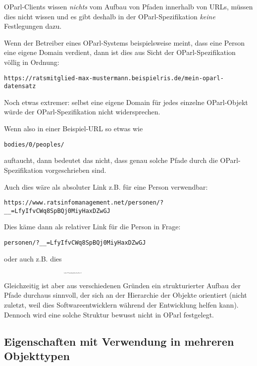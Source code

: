 \documentclass[,a4paper]{article}
\begin{document}
OParl-Clients wissen \emph{nichts} vom Aufbau von Pfaden innerhalb von
URLs, müssen dies nicht wissen und es gibt deshalb in der
OParl-Spezifikation \emph{keine} Festlegungen dazu.

Wenn der Betreiber eines OParl-Systems beispielsweise meint, dass eine
Person eine eigene Domain verdient, dann ist dies aus Sicht der
OParl-Spezifikation völlig in Ordnung:

\begin{verbatim}
https://ratsmitglied-max-mustermann.beispielris.de/mein-oparl-datensatz
\end{verbatim}

Noch etwas extremer: selbst eine eigene Domain für jedes einzelne
OParl-Objekt würde der OParl-Spezifikation nicht widersprechen.

Wenn also in einer Beispiel-URL so etwas wie

\begin{verbatim}
bodies/0/peoples/
\end{verbatim}

auftaucht, dann bedeutet das nicht, dass genau solche Pfade durch die
OParl-Spezifikation vorgeschrieben sind.

Auch dies wäre als absoluter Link z.B. für eine Person verwendbar:

\begin{verbatim}
https://www.ratsinfomanagement.net/personen/?__=LfyIfvCWq8SpBQj0MiyHaxDZwGJ
\end{verbatim}

Dies käme dann als relativer Link für die Person in Frage:

\begin{verbatim}
personen/?__=LfyIfvCWq8SpBQj0MiyHaxDZwGJ
\end{verbatim}

oder auch z.B. dies
\textsubscript{\textsubscript{\textsubscript{\textsubscript{\textsubscript{\textsubscript{\textsubscript{\textsubscript{\textsubscript{\textsubscript{
LfyIfvCWq8SpBQj0MiyHaxDZwGJ }}}}}}}}}}

Gleichzeitig ist aber aus verschiedenen Gründen ein strukturierter
Aufbau der Pfade durchaus sinnvoll, der sich an der Hierarchie der
Objekte orientiert (nicht zuletzt, weil dies Softwareentwicklern während
der Entwicklung helfen kann). Dennoch wird eine solche Struktur bewusst
nicht in OParl festgelegt.

\subsection{Eigenschaften mit Verwendung in mehreren
Objekttypen}\label{eigenschaften-mit-verwendung-in-mehreren-objekttypen}
\end{document}
